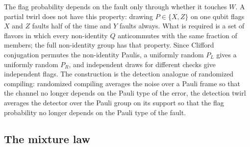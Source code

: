 \documentclass[11pt,a4paper]{article}
\theoremstyle{remark}
\begin{document}
The flag probability depends on the fault only through whether it touches $W$. A partial twirl does not have this property: drawing $P\in\{X,Z\}$ on one qubit flags $X$ and $Z$ faults half of the time and $Y$ faults always. What is required is a set of flavors in which every non-identity $Q$ anticommutes with the same fraction of members; the full non-identity group has that property. Since Clifford conjugation permutes the non-identity Paulis, a uniformly random $P_L$ gives a uniformly random $P_R$, and independent draws for different checks give independent flags. The construction is the detection analogue of randomized compiling: randomized compiling averages the noise over a Pauli frame so that the channel no longer depends on the Pauli type of the error, the detection twirl averages the detector over the Pauli group on its support so that the flag probability no longer depends on the Pauli type of the fault.

\subsection{The mixture law}
\end{document}
